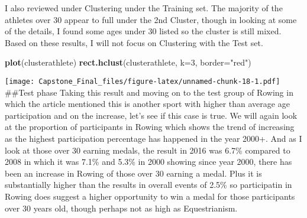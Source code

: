 \documentclass[]{article}
\newenvironment{Shaded}{\begin{snugshade}}{\end{snugshade}}
\newcommand{\KeywordTok}[1]{\textcolor[rgb]{0.13,0.29,0.53}{\textbf{#1}}}
\newcommand{\DataTypeTok}[1]{\textcolor[rgb]{0.13,0.29,0.53}{#1}}
\newcommand{\DecValTok}[1]{\textcolor[rgb]{0.00,0.00,0.81}{#1}}
\newcommand{\StringTok}[1]{\textcolor[rgb]{0.31,0.60,0.02}{#1}}
\newcommand{\CommentTok}[1]{\textcolor[rgb]{0.56,0.35,0.01}{\textit{#1}}}
\newcommand{\OperatorTok}[1]{\textcolor[rgb]{0.81,0.36,0.00}{\textbf{#1}}}
\newcommand{\NormalTok}[1]{#1}
\begin{document}
I also reviewed under Clustering under the Training set. The majority of
the athletes over 30 appear to full under the 2nd Cluster, though in
looking at some of the details, I found some ages under 30 listed so the
cluster is still mixed. Based on these results, I will not focus on
Clustering with the Test set.

\begin{Shaded}
\begin{Highlighting}[]
\KeywordTok{plot}\NormalTok{(clusterathlete)}
\KeywordTok{rect.hclust}\NormalTok{(clusterathlete, }\DataTypeTok{k=}\DecValTok{3}\NormalTok{, }\DataTypeTok{border=}\StringTok{"red"}\NormalTok{)}
\end{Highlighting}
\end{Shaded}

\texttt{[image: Capstone\_Final\_files/figure-latex/unnamed-chunk-18-1.pdf]}
\#\#Test phase Taking this result and moving on to the test group of
Rowing in which the article mentioned this is another sport with higher
than average age participation and on the increase, let's see if this
case is true. We will again look at the proportion of participants in
Rowing which shows the trend of increasing as the highest participation
percentage has happened in the year 2000+. And as I look at those over
30 earning medals, the result in 2016 was 6.7\% compared to 2008 in
which it was 7.1\% and 5.3\% in 2000 showing since year 2000, there has
been an increase in Rowing of those over 30 earning a medal. Plus it is
substantially higher than the results in overall events of 2.5\% so
participatin in Rowing does suggest a higher opportunity to win a medal
for those participants over 30 years old, though perhaps not as high as
Equestrianism.

\begin{Shaded}
\end{Shaded}
\end{document}
